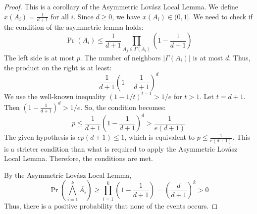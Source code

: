 \begin{proof}
This is a corollary of the Asymmetric Lovász Local Lemma. We define $x(A_i) = \frac{1}{d+1}$ for all $i$. Since $d \ge 0$, we have $x(A_i) \in (0, 1]$. We need to check if the condition of the asymmetric lemma holds:
$$\Pr(A_i) \leq \frac{1}{d+1} \prod_{A_j \in \Gamma(A_i)} \left(1 - \frac{1}{d+1}\right)$$
The left side is at most $p$. The number of neighbors $|\Gamma(A_i)|$ is at most $d$. Thus, the product on the right is at least:
$$\frac{1}{d+1} \left(1 - \frac{1}{d+1}\right)^d$$
We use the well-known inequality $(1 - 1/t)^{t-1} > 1/e$ for $t > 1$. Let $t=d+1$. Then $\left(1 - \frac{1}{d+1}\right)^d > 1/e$.
So, the condition becomes:
$$p \leq \frac{1}{d+1} \left(1 - \frac{1}{d+1}\right)^d > \frac{1}{e(d+1)}$$
The given hypothesis is $ep(d+1) \leq 1$, which is equivalent to $p \leq \frac{1}{e(d+1)}$. This is a stricter condition than what is required to apply the Asymmetric Lovász Local Lemma. Therefore, the conditions are met.

By the Asymmetric Lovász Local Lemma,
$$\Pr\left(\bigwedge_{i=1}^k \overline{A_i}\right) \geq \prod_{i=1}^k \left(1 - \frac{1}{d+1}\right) = \left(\frac{d}{d+1}\right)^k > 0$$
Thus, there is a positive probability that none of the events occurs.
\end{proof}
